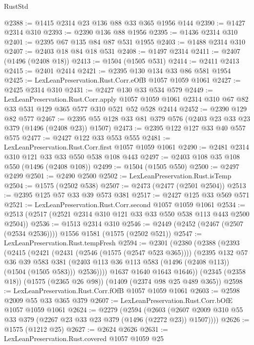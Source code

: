 \begin{lexlean}{RustStd}
\begin{coremodule}
@2388 := @1415 @2314 @23 @136 @88 @33 @365 @1956 @144
@2390 := @1427 @2314 @310
@2393 := @2390 @136 @88 @1956
@2395 := @1436 @2314 @310
@2401 := @2395 @67 @135 @84 @87 @531 @1955
@2403 := @1488 @2314 @310
@2407 := @2403 @18 @84 @18 @531
@2408 := @1497 @2314
@2411 := @2407 (@1496 (@2408 @18))
@2413 := @1504 (@1505 @531)
@2414 := @2411 @2413
@2415 := @2401 @2414
@2421 := @2395 @130 @134 @33 @86 @581 @1954
@2425 := LexLeanPreservation.Rust.Corr.eOfB @1057 @1059 @1061
@2427 := @2425 @2314 @310
@2431 := @2427 @130 @33 @534 @579
@2449 := LexLeanPreservation.Rust.Corr.apply
    @1057
    @1059
    @1061
    @2314
    @310
    @67
    @82
    @33
    @531
    @129
    @365
    @577
    @310
    @521
    @52
    @528
    @2414
@2452 := @2390 @129 @82 @577
@2467 := @2395 @55 @128 @33 @81 @379 @576 (@2403 @23 @33 @23 @379 (@1496 (@2408 @23)) @1507)
@2473 := @2395 @122 @127 @33 @40 @557 @575
@2477 := @2427 @122 @33 @553 @555
@2481 := LexLeanPreservation.Rust.Corr.first @1057 @1059 @1061
@2490 := @2481 @2314 @310 @121 @33 @33 @550 @538 @108 @443
@2497 := @2403 @108 @35 @108 @550 (@1496 (@2408 @108))
@2499 := @1504 (@1505 @550)
@2500 := @2497 @2499
@2501 := @2490 @2500
@2502 := LexLeanPreservation.Rust.isTemp
@2504 := @1575 (@2502 @538)
@2507 := @2473 (@2477 (@2501 @2504))
@2513 := @2395 @125 @57 @33 @39 @573 @381
@2517 := @2427 @125 @33 @569 @571
@2521 := LexLeanPreservation.Rust.Corr.second @1057 @1059 @1061
@2534 := @2513 (@2517 (@2521 @2314 @310 @121 @33 @33 @550 @538 @113 @443 @2500 @2504))
@2536 := @1513 @2314 @310
@2546 := @2449 (@2452 (@2467 (@2507 (@2534 @2536)))) @1556 @1581 (@1575 (@2502 @521))
@2547 := LexLeanPreservation.Rust.tempFresh
@2594 := @2301
    (@2380
      (@2388
        (@2393
          (@2415
            (@2421
              (@2431 (@2546 (@1575 (@2547 @523 @365))))
              (@2395
                @132
                @57
                @36
                @39
                @583
                @381
                (@2403 @113 @36 @113 @583 (@1496 (@2408 @113)) (@1504 (@1505 @583)))
                @2536))))
        @1637
        @1640
        @1643
        @1646))
    (@2345 (@2358 @18))
    (@1575 (@2365 @26 @98))
    (@1409 (@2374 @98 @25 @489 @365))
@2598 := LexLeanPreservation.Rust.Corr.fOfB @1057 @1059 @1061
@2603 := @2598 @2009 @55 @33 @365 @379
@2607 := LexLeanPreservation.Rust.Corr.bOfE @1057 @1059 @1061
@2624 := @2279
    (@2594
      (@2603 (@2607 @2009 @310 @55 @33 @379 (@2267 @23 @33 @23 @379 (@1496 (@2272 @23)) @1507))))
@2626 := @1575 (@1212 @25)
@2627 := @2624 @2626
@2631 := LexLeanPreservation.Rust.covered @1057 @1059 @25

\end{coremodule}
\end{lexlean}

